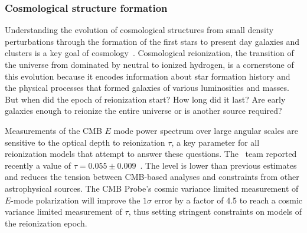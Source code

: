 
\vspace{-0.15in}

\subsubsection{Cosmological structure formation}

\vspace{-0.05in}

Understanding the evolution of cosmological structures from small density perturbations through the formation of the
first stars to present day galaxies and clusters is a key goal of cosmology~\cite{dunlop2011}. 
Cosmological reionization, the transition of the universe from dominated by neutral to ionized 
hydrogen, is a cornerstone of this evolution because it encodes information 
about star formation history and the physical processes that formed galaxies of various luminosities and masses. 
But when did the epoch of reionization start?  How long did it last? Are early galaxies enough to reionize the entire universe
or is another source required?
 
Measurements of the \ac{CMB} $E$ mode power spectrum over large angular scales are sensitive to the optical depth 
to reionization $\tau$, a key parameter for all reionization models that attempt to answer these questions. 
The \planck\ team  reported recently a value of $\tau=0.055 \pm 0.009$~\cite{planck2016_xlvi,planck2016_xxxi}.
The level is lower than previous estimates and reduces the tension between CMB-based analyses and constraints from 
other astrophysical sources.  
The CMB Probe's cosmic variance limited measurement of $E$-mode polarization will 
improve the $1\sigma$ error by a factor of 4.5 to reach a cosmic 
variance limited measurement of $\tau$, thus setting 
stringent constraints on models of the reionization epoch. 

